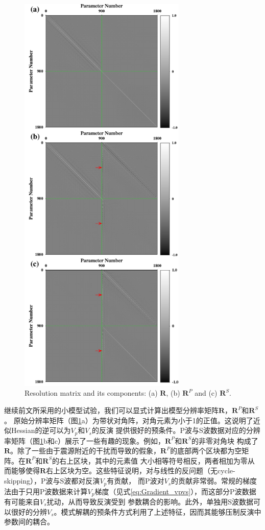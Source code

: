 \begin{figure}
    \begin{center}
        \includegraphics[width=8cm]{Figure/chapter02/ResoOpera/Fig/resolutionoriginal.pdf}
        \caption{
Resolution matrix and its components:
(a) $\mathbf{R}$, (b) $\mathbf{R}^P$ and (c) $\mathbf{R}^S$.
    }
    \label{fig:Resolution}
    \end{center}
\end{figure}
继续前文所采用的小模型试验，我们可以显式计算出模型分辨率矩阵$\mathbf{R}$，$\mathbf{R}^P$和$\mathbf{R}^S$。
原始分辨率矩阵（图\ref{fig:Resolution}a）为带状对角阵，对角元素为小于1的正值。这说明了近似Hessian的逆可以为$V_p$和$V_s$的反演
提供很好的预条件。P波与S波数据对应的分辨率矩阵（图\ref{fig:Resolution}b和c）展示了一些有趣的现象。例如，$\mathbf{R}^P$和$\mathbf{R}^S$的非零对角块
构成了$\mathbf{R}$。除了一些由于震源附近的干扰而导致的假象，$\mathbf{R}^P$的底部两个区块都为空矩阵。在$\mathbf{R}^P$和$\mathbf{R}^S$的右上区块，其中的元素值
大小相等符号相反，两者相加为零从而能够使得$\mathbf{R}$右上区块为空。这些特征说明，对与线性的反问题（无cycle-skipping），P波与S波都对反演$V_p$有贡献，
而P波对$V_s$的贡献非常弱。常规的梯度法由于只用P波数据来计算$V_p$梯度（见式\ref{eq:Gradient_vpvs}），而这部分P波数据有可能来自$V_s$扰动，从而导致反演受到
参数耦合的影响。此外，单独用S波数据可以很好的分辨$V_s$。模式解耦的预条件方式利用了上述特征，因而其能够压制反演中参数间的耦合。
